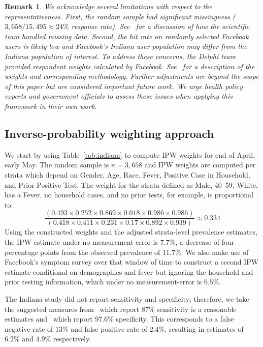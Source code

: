 \documentclass[11pt]{amsart}
\numberwithin{equation}{section}
\theoremstyle{plain}
\newtheorem{remark}{Remark}
\begin{document}
\begin{remark}
 We acknowledge several limitations with respect to the representativeness.  First, the random sample had significant missingness ($3,658/15,495 \approx 24\%$ response rate). See~\cite{Yiannoutsos2021} for a discussion of how the scientific team handled missing data. Second, the hit rate on randomly selected Facebook users is likely low and Facebook's Indiana user population may differ from the Indiana population of interest.  To address these concerns, the Delphi team provided respondent weights calculated by Facebook.  See~\cite{Barkay2020} for a description of the weights and corresponding methodology.  Further adjustments are beyond the scope of this paper but are considered important future work. We urge health policy experts and government officials to assess these issues when applying this framework in their own work.
 \end{remark}


 \subsection{Inverse-probability weighting approach}
 \label{section:ipwapproach}



 We start by using Table~\ref{tab:indiana} to compute IPW weights for end of April, early May.  The random sample is $n=3,658$ and IPW weights are computed per strata which depend on Gender, Age, Race, Fever, Positive Case in Household, and Prior Positive Test.  The weight for the strata defined as Male, 40--59, White, has a Fever, no household cases, and no prior tests, for example, is proportional to:
 $$
 \frac{\left( 0.493 \times 0.252 \times 0.869 \times 0.018 \times 0.986 \times 0.986 \right)}{\left(0.418 \times 0.411 \times 0.231 \times 0.17 \times 0.892 \times 0.939 \right)} \approx 0.334
 $$
 Using the constructed weights and the adjusted strata-level prevalence estimates, the IPW estimate under no measurement-error is $7.7\%$, a decrease of four percentage points from the observed prevalence of $11.7\%$. We also make use of Facebook's symptom survey over that window of time to construct a second IPW estimate conditional on demographics and fever but ignoring the household and prior testing information, which under no measurement-error is $6.5$\%.

 The Indiana study did not report sensitivity and specificity; therefore, we take the suggested measures from~\cite{Arevalo2020} which report 87\% sensitivity is a reasonable estimates and~\cite{Cohen2020} which report 97.6\% specificity.  This corresponds to a false negative rate of $13$\% and false positive rate of $2.4\%$, resulting in estimates of $6.2\%$ and $4.9\%$ respectively.
\end{document}
